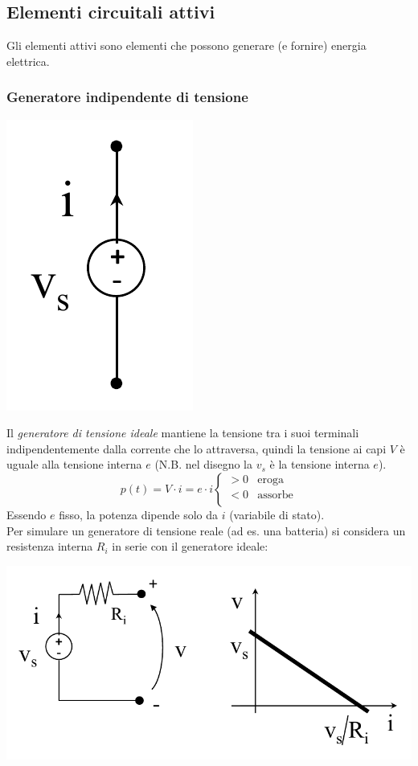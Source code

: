 \documentclass{article}
\begin{document}
\subsection{Elementi circuitali attivi}
Gli elementi attivi sono elementi che possono generare (e fornire) energia elettrica.


\subsubsection{Generatore indipendente di tensione}
\begin{center}
    \includegraphics[scale=0.4]{Image/Gen Tensione ideale.png}
\end{center}
Il \textit{generatore di tensione ideale} mantiene
la tensione tra i suoi terminali indipendentemente dalla
corrente che lo attraversa, quindi la tensione ai capi $V$ è uguale alla tensione interna $e$ (N.B. nel disegno la $v_s$ è la tensione interna $e$).
\[
    p(t) = V \cdot i = e \cdot i 
    \begin{cases} 
        >0 &\text{eroga}\\
        <0 &\text{assorbe}\\
    \end{cases}
\]
Essendo $e$ fisso, la potenza dipende solo da $i$ (variabile di stato).
\vspace*{0.2cm}\\
Per simulare un generatore
di tensione reale (ad es. una batteria) si
considera un resistenza
interna $R_i$ in serie con il
generatore ideale:
\begin{center}
    \includegraphics[scale=0.4]{Image/Gen tensione reale.png}
\end{center}
\end{document}
